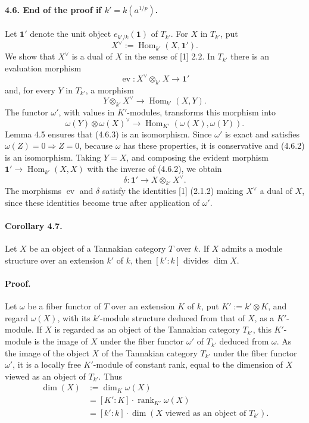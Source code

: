 \documentclass[11pt]{article}
\newcommand{\Hom}{\operatorname{Hom}}
\newcommand{\rank}{\operatorname{rank}}
\newcommand{\one}{\mathbf{1}}
\theoremstyle{plain}
\theoremstyle{definition}
\begin{document}
\paragraph{4.6. End of the proof if $k'=k(a^{1/p})$.} Let $\one'$ denote the unit object $e_{k'/k}(\one)$ of $T_{k'}$. For $X$ in $T_{k'}$, put
\[
   X^\vee:=\Hom_{k'}(X,\one').
\]
We show that $X^\vee$ is a dual of $X$ in the sense of [1] 2.2. In $T_{k'}$ there is an evaluation morphism
\begin{equation}\tag{4.6.1}
   \operatorname{ev}:X^\vee\otimes_{k'}X\longrightarrow\one'
\end{equation}
and, for every $Y$ in $T_{k'}$, a morphism
\begin{equation}\tag{4.6.2}
   Y\otimes_{k'}X^\vee\longrightarrow\Hom_{k'}(X,Y).
\end{equation}
The functor $\omega'$, with values in $K'$-modules, transforms this morphism into
\begin{equation}\tag{4.6.3}
   \omega(Y)\otimes\omega(X)^\vee\longrightarrow\Hom_{K'}(\omega(X),\omega(Y)).
\end{equation}
Lemma 4.5 ensures that (4.6.3) is an isomorphism. Since $\omega'$ is exact and satisfies $\omega(Z)=0\Rightarrow Z=0$, because $\omega$ has these properties, it is conservative and (4.6.2) is an isomorphism. Taking $Y=X$, and composing the evident morphism $\one'\to\Hom_{k'}(X,X)$ with the inverse of (4.6.2), we obtain
\[
   \delta:\one'\longrightarrow X\otimes_{k'}X^\vee.
\]
The morphisms $\operatorname{ev}$ and $\delta$ satisfy the identities [1] (2.1.2) making $X^\vee$ a dual of $X$, since these identities become true after application of $\omega'$.

\paragraph{Corollary 4.7.} Let $X$ be an object of a Tannakian category $T$ over $k$. If $X$ admits a module structure over an extension $k'$ of $k$, then $[k':k]$ divides $\dim X$.

\paragraph{Proof.} Let $\omega$ be a fiber functor of $T$ over an extension $K$ of $k$, put $K':=k'\otimes K$, and regard $\omega(X)$, with its $k'$-module structure deduced from that of $X$, as a $K'$-module. If $X$ is regarded as an object of the Tannakian category $T_{k'}$, this $K'$-module is the image of $X$ under the fiber functor $\omega'$ of $T_{k'}$ deduced from $\omega$. As the image of the object $X$ of the Tannakian category $T_{k'}$ under the fiber functor $\omega'$, it is a locally free $K'$-module of constant rank, equal to the dimension of $X$ viewed as an object of $T_{k'}$. Thus
\[
\begin{aligned}
\dim(X)&:=\dim_K\omega(X)\\
 &= [K':K]\cdot\rank_{K'}\omega(X)\\
 &= [k':k]\cdot \dim(X\text{ viewed as an object of }T_{k'}).
\end{aligned}
\]
\end{document}
